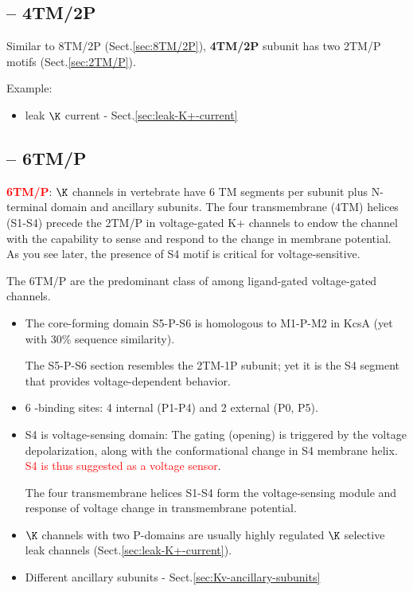 \subsection{-- 4TM/2P}
\label{sec:4TM/2P}

Similar to 8TM/2P (Sect.\ref{sec:8TM/2P}), {\bf 4TM/2P} subunit has two 2TM/P
motifs (Sect.\ref{sec:2TM/P}).

Example:
\begin{itemize}
  \item leak $\K$ current - Sect.\ref{sec:leak-K+-current}
\end{itemize}


\subsection{-- 6TM/P}
\label{sec:6TM/P}

\textcolor{red}{\bf 6TM/P}: $\K$ channels in vertebrate have 6 TM segments per
subunit plus N-terminal domain and ancillary subunits. The four transmembrane
(4TM) helices (S1-S4) precede the 2TM/P in voltage-gated K+ channels to endow
the channel with the capability to sense and respond to the change in membrane
potential. As you see later, the presence of S4 motif is critical for
voltage-sensitive.

The 6TM/P are the predominant class of among ligand-gated voltage-gated 
channels.
\begin{itemize}
  \item The core-forming domain S5-P-S6 is homologous to M1-P-M2 in KcsA
  (yet with 30\% sequence similarity).

The S5-P-S6 section resembles the 2TM-1P subunit; yet it is the S4 segment that 
provides voltage-dependent behavior.

  \item  6 -binding sites: 4 internal (P1-P4) and 2 external (P0, P5).  

  \item S4 is voltage-sensing domain: The gating (opening) is triggered by the
voltage depolarization, along with the conformational change in S4 membrane
helix. \textcolor{red}{S4 is thus suggested as a voltage sensor}. 

The four transmembrane helices S1-S4 form the voltage-sensing module and
response of voltage change in transmembrane potential. 

  \item $\K$ channels with two P-domains are usually highly regulated $\K$
  selective leak channels (Sect.\ref{sec:leak-K+-current}).

  \item Different ancillary subunits - Sect.\ref{sec:Kv-ancillary-subunits}
  
\end{itemize}

